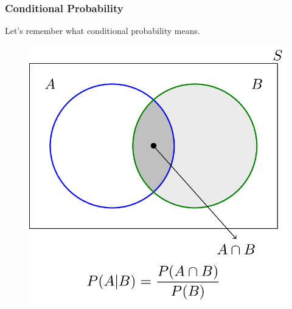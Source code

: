 \documentclass[xcolor=dvipsnames]{beamer}
\begin{document}


\begin{frame}
  \frametitle{Conditional Probability}
Let's remember what conditional probability means.
\begin{figure}[h]
\includegraphics[scale=.25]{./diagrams/conditional_b.png}
\end{figure}
\end{frame}
\end{document}
